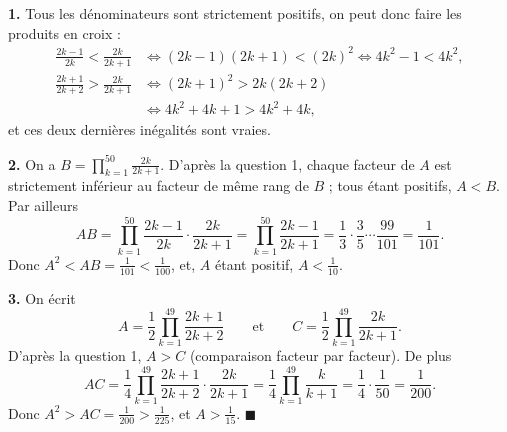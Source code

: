 \textbf{1.} Tous les dénominateurs sont strictement positifs, on peut donc
faire les produits en croix :
\[
\begin{aligned}
\frac{2k-1}{2k} < \frac{2k}{2k+1} &\iff (2k-1)(2k+1) < (2k)^2 \iff 4k^2 - 1 < 4k^2, \\
\frac{2k+1}{2k+2} > \frac{2k}{2k+1} &\iff (2k+1)^2 > 2k(2k+2) \\
&\iff 4k^2 + 4k + 1 > 4k^2 + 4k,
\end{aligned}
\]
et ces deux dernières inégalités sont vraies.

\textbf{2.} On a $B = \prod_{k=1}^{50} \frac{2k}{2k+1}$. D'après la
question 1, chaque facteur de $A$ est strictement inférieur au facteur de
même rang de $B$ ; tous étant positifs, $A < B$. Par ailleurs
\[
AB = \prod_{k=1}^{50} \frac{2k-1}{2k} \cdot \frac{2k}{2k+1}
= \prod_{k=1}^{50} \frac{2k-1}{2k+1}
= \frac{1}{3} \cdot \frac{3}{5} \cdots \frac{99}{101} = \frac{1}{101}.
\]
Donc $A^2 < AB = \frac{1}{101} < \frac{1}{100}$, et, $A$ étant positif,
$A < \frac{1}{10}$.

\textbf{3.} On écrit
\[
A = \frac12 \prod_{k=1}^{49} \frac{2k+1}{2k+2}
\qquad\text{et}\qquad
C = \frac12 \prod_{k=1}^{49} \frac{2k}{2k+1}.
\]
D'après la question 1, $A > C$ (comparaison facteur par facteur). De plus
\[
AC = \frac14 \prod_{k=1}^{49} \frac{2k+1}{2k+2} \cdot \frac{2k}{2k+1}
= \frac14 \prod_{k=1}^{49} \frac{k}{k+1} = \frac14 \cdot \frac{1}{50} = \frac{1}{200}.
\]
Donc $A^2 > AC = \frac{1}{200} > \frac{1}{225}$, et $A > \frac{1}{15}$.
\hfill $\blacksquare$
